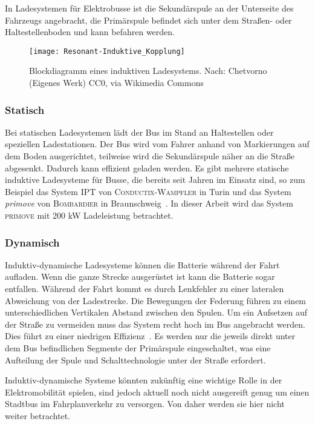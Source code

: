 In Ladesystemen für Elektrobusse ist die Sekundärspule an der Unterseite des Fahrzeugs angebracht, die Primärspule befindet sich unter dem Straßen- oder Haltestellenboden und kann befahren werden.


\begin{figure}\centering
	\texttt{[image: Resonant-Induktive\_Kopplung]}
	\caption[Blockdiagramm eines induktiven Ladesystems]{Blockdiagramm eines induktiven Ladesystems. Nach: Chetvorno (Eigenes Werk) CC0, via Wikimedia Commons}
	\label{abb_ResIndKopplung}
\end{figure}

\subsubsection{Statisch}
Bei statischen Ladesystemen lädt der Bus im Stand an Haltestellen oder speziellen Ladestationen. Der Bus wird vom Fahrer anhand von Markierungen auf dem Boden ausgerichtet, teilweise wird die Sekundärspule näher an die Straße abgesenkt. Dadurch kann effizient geladen werden. Es gibt mehrere statische induktive Ladesysteme für Busse, die bereits seit Jahren im Einsatz sind, so zum Beispiel das System \textsc{IPT} von \textsc{Conductix-Wampfler} in Turin und das System \emph{primove} von \textsc{Bombardier} in Braunschweig~\cite{WeIPT}. In dieser Arbeit wird das System \textsc{primove} mit 200 kW Ladeleistung betrachtet.

\subsubsection{Dynamisch}
Induktiv-dynamische Ladesysteme können die Batterie während der Fahrt aufladen. Wenn die ganze Strecke ausgerüstet ist kann die Batterie sogar entfallen. Während der Fahrt kommt es durch Lenkfehler zu einer lateralen Abweichung von der Ladestrecke. Die Bewegungen der Federung führen zu einem unterschiedlichen Vertikalen Abstand zwischen den Spulen. Um ein Aufsetzen auf der Straße zu vermeiden muss das System recht hoch im Bus angebracht werden. Dies führt zu einer niedrigen Effizienz~\cite{5618092}. Es werden nur die jeweils direkt unter dem Bus befindlichen Segmente der Primärspule eingeschaltet, was eine Aufteilung der Spule und Schalttechnologie unter der Straße erfordert.

Induktiv-dynamische Systeme könnten zukünftig eine wichtige Rolle in der Elektromobilität spielen, sind jedoch aktuell noch nicht ausgereift genug um einen Stadtbus im Fahrplanverkehr zu versorgen. Von daher werden sie hier nicht weiter betrachtet. 

